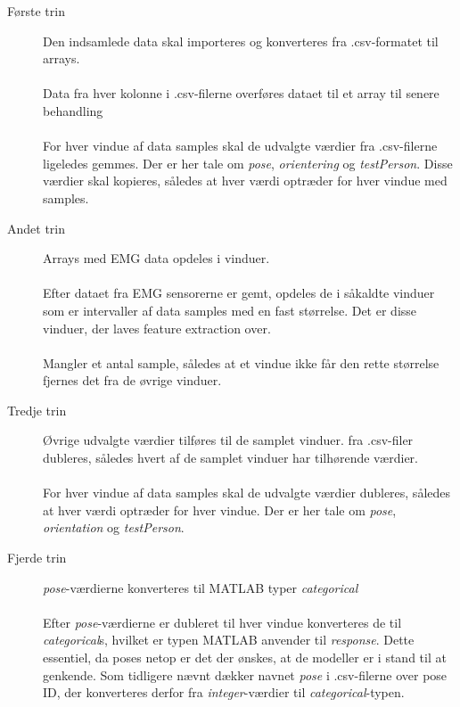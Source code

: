 \begin{description}
	\item[Første trin] Den indsamlede data skal importeres og konverteres fra .csv-formatet til arrays.\\\\
		Data fra hver kolonne i .csv-filerne overføres dataet til et array til senere behandling
	\\\\
	For hver vindue af data samples skal de udvalgte værdier fra .csv-filerne ligeledes gemmes. Der er her tale om \textit{pose}, \textit{orientering} og \textit{testPerson}. Disse værdier skal kopieres, således at hver værdi optræder for hver vindue med samples.

  \item[Andet trin] Arrays med EMG data opdeles i vinduer. 
  \\\\
  Efter dataet fra EMG sensorerne er gemt, opdeles de i såkaldte vinduer som er intervaller af data samples med en fast størrelse. Det er disse vinduer, der laves feature extraction over.
  \\\\
  Mangler et antal sample, således at et vindue ikke får den rette størrelse fjernes det fra de øvrige vinduer. 
    \item[Tredje trin] Øvrige udvalgte værdier tilføres til de samplet vinduer.
     fra .csv-filer dubleres, således hvert af de samplet vinduer har tilhørende værdier.
  \\\\
  For hver vindue af data samples skal de udvalgte værdier dubleres, således at hver værdi optræder for hver vindue. Der er her tale om \textit{pose}, \textit{orientation} og \textit{testPerson}.
  
  \item[Fjerde trin] \textit{pose}-værdierne konverteres til MATLAB typer \textit{categorical}
  \\\\
  Efter \textit{pose}-værdierne er dubleret til hver vindue konverteres de til \textit{categorical}s, hvilket er typen MATLAB anvender til \textit{response}. Dette essentiel, da poses netop er det der ønskes, at de modeller er i stand til at genkende. Som tidligere nævnt dækker navnet \textit{pose} i .csv-filerne over pose ID, der konverteres derfor fra \textit{integer}-værdier til \textit{categorical}-typen. 
\end{description}

